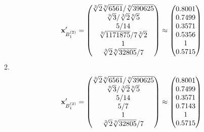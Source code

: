 \documentclass[10pt,a4paper]{article}
\begin{document}
	\[
		\bold{x}'_{B_1^{(2)}} = 
		\begin{pmatrix}
			{\sqrt[3]{2}\sqrt[9]{6561}} / {\sqrt[9]{390625}} \\
			{\sqrt[9]{3}} / {\sqrt[3]{2}\sqrt[9]{5}} \\
			{{5}} / {{14}} \\
			{\sqrt[9]{1171875}} / {{7}\sqrt[3]{2}} \\
			{1}{} \\
			{\sqrt[3]{2}\sqrt[9]{32805}} / {{7}} \\
		\end{pmatrix}
		\approx
		\begin{pmatrix}
			0.8001   \\
			0.7499   \\
			0.3571   \\
			0.5356   \\
			1        \\
			0.5715   \\
		\end{pmatrix}
	\]
	2.
	\[
		\bold{x}'_{B_1^{(2)}} = 
		\begin{pmatrix}
			{\sqrt[3]{2}\sqrt[9]{6561}} / {\sqrt[9]{390625}} \\
			{\sqrt[9]{3}} / {\sqrt[3]{2}\sqrt[9]{5}} \\
			{{5}} / {{14}} \\
			{{5}} / {{7}} \\
			{1}{} \\
			{\sqrt[3]{2}\sqrt[9]{32805}} / {{7}} \\
		\end{pmatrix}
		\approx
		\begin{pmatrix}
			0.8001   \\
			0.7499   \\
			0.3571   \\
			0.7143   \\
			1        \\
			0.5715   \\
		\end{pmatrix}
	\]
\end{document}
